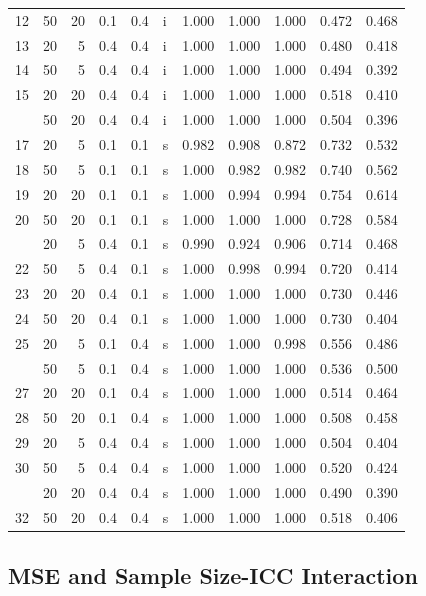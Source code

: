 \documentclass[
  11pt,
]{article}
\begin{document}
\begin{table}[!h]
{\begin{tabular}[t]{rrrrrlrrrrr}
12 & 50 & 20 & 0.1 & 0.4 & i & 1.000 & 1.000 & 1.000 & 0.472 & 0.468\\
13 & 20 & 5 & 0.4 & 0.4 & i & 1.000 & 1.000 & 1.000 & 0.480 & 0.418\\
14 & 50 & 5 & 0.4 & 0.4 & i & 1.000 & 1.000 & 1.000 & 0.494 & 0.392\\
15 & 20 & 20 & 0.4 & 0.4 & i & 1.000 & 1.000 & 1.000 & 0.518 & 0.410\\
\addlinespace
16 & 50 & 20 & 0.4 & 0.4 & i & 1.000 & 1.000 & 1.000 & 0.504 & 0.396\\
17 & 20 & 5 & 0.1 & 0.1 & s & 0.982 & 0.908 & 0.872 & 0.732 & 0.532\\
18 & 50 & 5 & 0.1 & 0.1 & s & 1.000 & 0.982 & 0.982 & 0.740 & 0.562\\
19 & 20 & 20 & 0.1 & 0.1 & s & 1.000 & 0.994 & 0.994 & 0.754 & 0.614\\
20 & 50 & 20 & 0.1 & 0.1 & s & 1.000 & 1.000 & 1.000 & 0.728 & 0.584\\
\addlinespace
21 & 20 & 5 & 0.4 & 0.1 & s & 0.990 & 0.924 & 0.906 & 0.714 & 0.468\\
22 & 50 & 5 & 0.4 & 0.1 & s & 1.000 & 0.998 & 0.994 & 0.720 & 0.414\\
23 & 20 & 20 & 0.4 & 0.1 & s & 1.000 & 1.000 & 1.000 & 0.730 & 0.446\\
24 & 50 & 20 & 0.4 & 0.1 & s & 1.000 & 1.000 & 1.000 & 0.730 & 0.404\\
25 & 20 & 5 & 0.1 & 0.4 & s & 1.000 & 1.000 & 0.998 & 0.556 & 0.486\\
\addlinespace
26 & 50 & 5 & 0.1 & 0.4 & s & 1.000 & 1.000 & 1.000 & 0.536 & 0.500\\
27 & 20 & 20 & 0.1 & 0.4 & s & 1.000 & 1.000 & 1.000 & 0.514 & 0.464\\
28 & 50 & 20 & 0.1 & 0.4 & s & 1.000 & 1.000 & 1.000 & 0.508 & 0.458\\
29 & 20 & 5 & 0.4 & 0.4 & s & 1.000 & 1.000 & 1.000 & 0.504 & 0.404\\
30 & 50 & 5 & 0.4 & 0.4 & s & 1.000 & 1.000 & 1.000 & 0.520 & 0.424\\
\addlinespace
31 & 20 & 20 & 0.4 & 0.4 & s & 1.000 & 1.000 & 1.000 & 0.490 & 0.390\\
32 & 50 & 20 & 0.4 & 0.4 & s & 1.000 & 1.000 & 1.000 & 0.518 & 0.406\\
\bottomrule
\end{tabular}}
\end{table}

\subsection{MSE and Sample Size-ICC Interaction}\label{mse-and-sample-size-icc-interaction}
\end{document}
